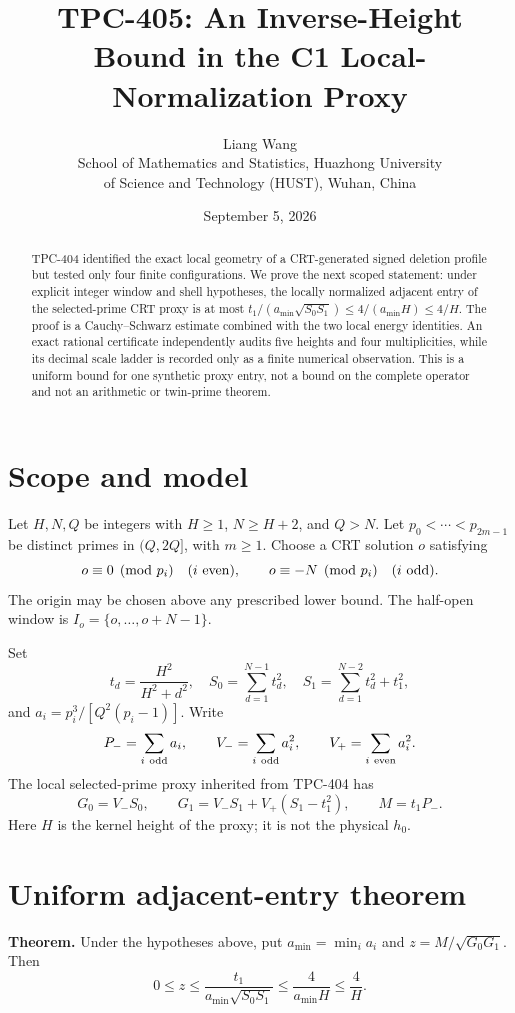 \documentclass[11pt]{article}
\title{TPC-405: An Inverse-Height Bound in the C1 Local-Normalization Proxy}
\author{Liang Wang\\School of Mathematics and Statistics, Huazhong University\\of Science and Technology (HUST), Wuhan, China}
\date{September 5, 2026}
\begin{document}
\maketitle

\begin{abstract}
TPC-404 identified the exact local geometry of a CRT-generated signed
deletion profile but tested only four finite configurations.  We prove the
next scoped statement: under explicit integer window and shell hypotheses,
the locally normalized adjacent entry of the selected-prime CRT proxy is at
most $t_1/(a_{\min}\sqrt{S_0S_1})\leq4/(a_{\min}H)\leq4/H$.  The proof is a
Cauchy--Schwarz estimate combined with the two local energy identities.  An
exact rational certificate independently audits five heights and four
multiplicities, while its decimal scale ladder is recorded only as a finite
numerical observation.  This is a uniform bound for one synthetic proxy entry,
not a bound on the complete operator and not an arithmetic or twin-prime
theorem.
\end{abstract}

\section{Scope and model}
Let $H,N,Q$ be integers with $H\geq1$, $N\geq H+2$, and $Q>N$.  Let
$p_0<\cdots<p_{2m-1}$ be distinct primes in $(Q,2Q]$, with $m\geq1$.
Choose a CRT solution $o$ satisfying
\[
 o\equiv0\pmod {p_i}\quad(i\ {\rm even}),\qquad
 o\equiv-N\pmod {p_i}\quad(i\ {\rm odd}).
\]
The origin may be chosen above any prescribed lower bound.  The half-open
window is $I_o=\{o,\ldots,o+N-1\}$.

Set
\[
 t_d=\frac{H^2}{H^2+d^2},\quad
 S_0=\sum_{d=1}^{N-1}t_d^2,\quad
 S_1=\sum_{d=1}^{N-2}t_d^2+t_1^2,
\]
and $a_i=p_i^3/[Q^2(p_i-1)]$.  Write
\[
 P_-=\sum_{i\ {\rm odd}}a_i,\qquad
 V_-=\sum_{i\ {\rm odd}}a_i^2,\qquad
 V_+=\sum_{i\ {\rm even}}a_i^2.
\]
The local selected-prime proxy inherited from TPC-404 has
\[
 G_0=V_-S_0,\qquad
 G_1=V_-S_1+V_+(S_1-t_1^2),\qquad M=t_1P_-.
\]
Here $H$ is the kernel height of the proxy; it is not the physical $h_0$.

\section{\hspace{0.2em}Uniform adjacent-entry theorem}
\textbf{Theorem.}
Under the hypotheses above, put $a_{\min}=\min_i a_i$ and
$z=M/\sqrt{G_0G_1}$.  Then
\[
 0\leq z\leq\frac{t_1}{a_{\min}\sqrt{S_0S_1}}
 \leq\frac{4}{a_{\min}H}\leq\frac4H. \tag{1}
\]
\end{document}
